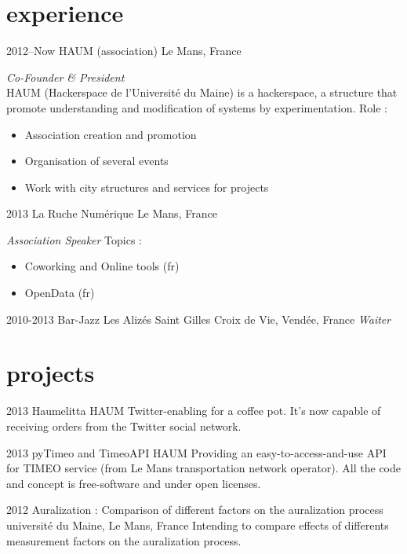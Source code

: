 \documentclass[]{friggeri-cv} %
\begin{document}

\section{experience}

\begin{entrylist}
\entry
{2012--Now}
{HAUM (association)}
{Le Mans, France}
{\emph{Co-Founder \& President} \\
HAUM (Hackerspace de l'Université du Maine) is a hackerspace, a structure that promote
understanding and modification of systems by experimentation.
Role :
\begin{itemize}
    \item Association creation and promotion
    \item Organisation of several events
    \item Work with city structures and services for projects
\end{itemize}
}
\entry
{2013}
{La Ruche Numérique}
{Le Mans, France}
{\emph{Association Speaker}
Topics :
\begin{itemize}
    \item Coworking and Online tools (fr)
    \item OpenData (fr)
\end{itemize}}
\entry
{2010-2013}
{Bar-Jazz Les Alizés}
{Saint Gilles Croix de Vie, Vendée, France}
{\emph{Waiter}}
\end{entrylist}


\section{projects}

\begin{entrylist}
\entry
{2013}
{Haumelitta}
{HAUM}
{Twitter-enabling for a coffee pot. It's now capable of receiving orders from the Twitter social network.}

\entry
{2013}
{pyTimeo and TimeoAPI}
{HAUM}
{Providing an easy-to-access-and-use API for TIMEO service (from Le Mans transportation network operator).
All the code and concept is free-software and under open licenses.}

\entry
{2012}
{Auralization : Comparison of different factors on the auralization process}
{université du Maine, Le Mans, France}
{Intending to compare effects of differents measurement factors on the auralization process.}
\end{entrylist}
\end{document}
